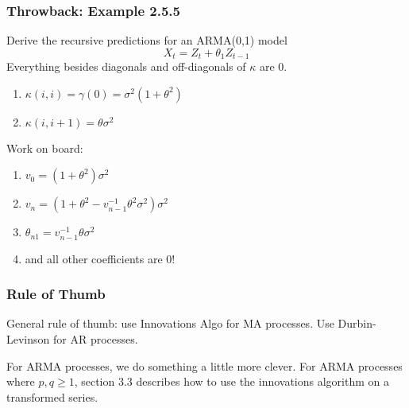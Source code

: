 \documentclass{beamer}
\begin{document}
\begin{frame}
\frametitle{Throwback: Example 2.5.5}

Derive the recursive predictions for an ARMA(0,1) model
\[
X_t = Z_t + \theta_1 Z_{t-1}
\]
Everything besides diagonals and off-diagonals of $\kappa$ are $0$. 
\begin{enumerate}
\item $\kappa(i,i) = \gamma(0) = \sigma^2(1 + \theta^2)$
\item $\kappa(i,i+1) = \theta \sigma^2$
\end{enumerate}

Work on board:
\begin{enumerate}
\item $v_0 = (1+\theta^2)\sigma^2$
\item $v_n = (1 + \theta^2 - v_{n-1}^{-1}\theta^2\sigma^2)\sigma^2$
\item $\theta_{n1} = v_{n-1}^{-1}\theta\sigma^2$
\item and all other coefficients are $0$!
\end{enumerate}

\end{frame}



\begin{frame}
\frametitle{Rule of Thumb}

General rule of thumb: use Innovations Algo for MA processes. Use Durbin-Levinson for AR processes.
\newline

For ARMA processes, we do something a little more clever. For ARMA processes where $p,q \ge 1$, section 3.3 describes how to use the innovations algorithm on a transformed series.
\end{frame}
\end{document}
